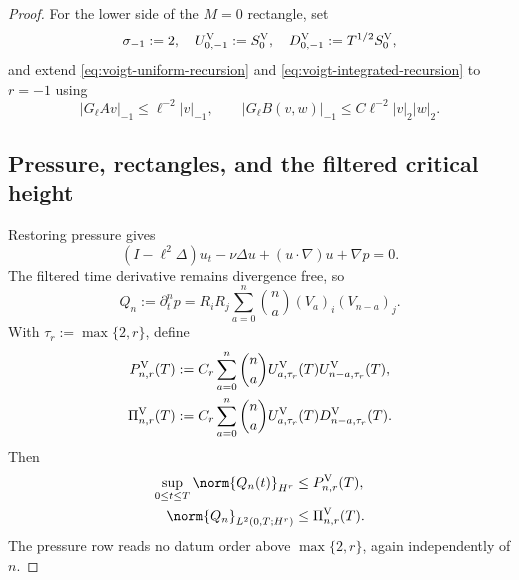 \begin{proof}
For the lower side of the \(M=0\) rectangle, set
\begin{equation}
 \sigma_{-1}:=2,
 \quad U_{0,-1}^{\rm V}:=S_0^{\rm V},
 \quad D_{0,-1}^{\rm V}:=T^{1/2}S_0^{\rm V},
 \label{eq:voigt-negative-base}
\end{equation}
and extend \eqref{eq:voigt-uniform-recursion} and
\eqref{eq:voigt-integrated-recursion} to \(r=-1\) using
\begin{equation}
 |G_\ell Av|_{-1}\le\ell^{-2}|v|_{-1},
 \qquad
 |G_\ell B(v,w)|_{-1}
 \le C\ell^{-2}|v|_2|w|_2.
 \label{eq:voigt-negative-multipliers}
\end{equation}

\subsection{Pressure, rectangles, and the filtered critical height}

Restoring pressure gives
\begin{equation}
 (I-\ell^2\Delta)u_t-\nu\Delta u
 +(u\cdot\nabla)u+\nabla p=0.
 \label{eq:voigt-unprojected}
\end{equation}
The filtered time derivative remains divergence free, so
\begin{equation}
 Q_n:=\partial_t^np
 =R_iR_j\sum_{a=0}^n\binom na(V_a)_i(V_{n-a})_j.
 \label{eq:voigt-pressure-recurrence}
\end{equation}
With \(\tau_r:=\max\{2,r\}\), define
\begin{align}
 P_{n,r}^{\rm V}(T)
 &:=C_r\sum_{a=0}^n\binom na
  U_{a,\tau_r}^{\rm V}(T)U_{n-a,\tau_r}^{\rm V}(T),
 \label{eq:voigt-pressure-envelope}\\
 \Pi_{n,r}^{\rm V}(T)
 &:=C_r\sum_{a=0}^n\binom na
  U_{a,\tau_r}^{\rm V}(T)D_{n-a,\tau_r}^{\rm V}(T).
 \label{eq:voigt-integrated-pressure-envelope}
\end{align}
Then
\begin{align}
 \sup_{0\le t\le T}\norm{Q_n(t)}_{H^r}
 &\le P_{n,r}^{\rm V}(T),
 \label{eq:voigt-pressure-bound}\\
 \norm{Q_n}_{L^2(0,T;H^r)}
 &\le\Pi_{n,r}^{\rm V}(T).
 \label{eq:voigt-integrated-pressure-bound}
\end{align}
The pressure row reads no datum order above \(\max\{2,r\}\), again
independently of \(n\).


\end{proof}
